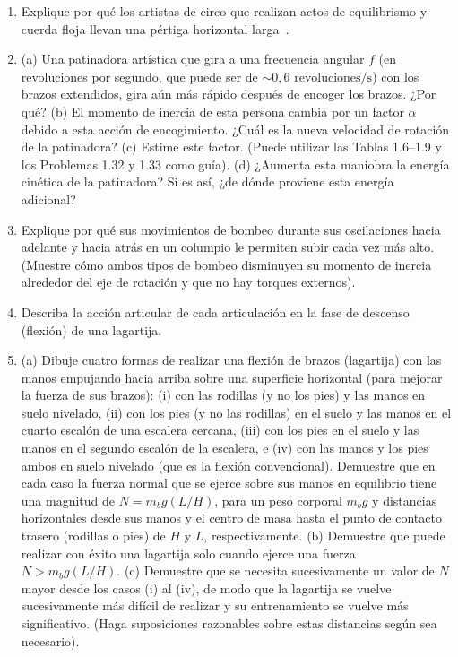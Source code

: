 \documentclass[12pt]{book}
\begin{document}
\begin{enumerate}
\item[3.59] Explique por qué los artistas de circo que realizan actos de equilibrismo y cuerda floja llevan una pértiga horizontal larga~\cite{ref16}.

\item[3.60] (a) Una patinadora artística que gira a una frecuencia angular $f$ (en revoluciones por segundo, que puede ser de $\sim 0{,}6\text{ revoluciones/s}$) con los brazos extendidos, gira aún más rápido después de encoger los brazos. ¿Por qué?
(b) El momento de inercia de esta persona cambia por un factor $\alpha$ debido a esta acción de encogimiento. ¿Cuál es la nueva velocidad de rotación de la patinadora?
(c) Estime este factor. (Puede utilizar las Tablas 1.6--1.9 y los Problemas 1.32 y 1.33 como guía).
(d) ¿Aumenta esta maniobra la energía cinética de la patinadora? Si es así, ¿de dónde proviene esta energía adicional?

\item[3.61] Explique por qué sus movimientos de bombeo durante sus oscilaciones hacia adelante y hacia atrás en un columpio le permiten subir cada vez más alto. (Muestre cómo ambos tipos de bombeo disminuyen su momento de inercia alrededor del eje de rotación y que no hay torques externos).

\item[3.62] Describa la acción articular de cada articulación en la fase de descenso (flexión) de una lagartija.

\item[3.63] (a) Dibuje cuatro formas de realizar una flexión de brazos (lagartija) con las manos empujando hacia arriba sobre una superficie horizontal (para mejorar la fuerza de sus brazos): (i) con las rodillas (y no los pies) y las manos en suelo nivelado, (ii) con los pies (y no las rodillas) en el suelo y las manos en el cuarto escalón de una escalera cercana, (iii) con los pies en el suelo y las manos en el segundo escalón de la escalera, e (iv) con las manos y los pies ambos en suelo nivelado (que es la flexión convencional). Demuestre que en cada caso la fuerza normal que se ejerce sobre sus manos en equilibrio tiene una magnitud de $N = m_b g (L/H)$, para un peso corporal $m_b g$ y distancias horizontales desde sus manos y el centro de masa hasta el punto de contacto trasero (rodillas o pies) de $H$ y $L$, respectivamente.
(b) Demuestre que puede realizar con éxito una lagartija solo cuando ejerce una fuerza $N > m_b g (L/H)$.
(c) Demuestre que se necesita sucesivamente un valor de $N$ mayor desde los casos (i) al (iv), de modo que la lagartija se vuelve sucesivamente más difícil de realizar y su entrenamiento se vuelve más significativo. (Haga suposiciones razonables sobre estas distancias según sea necesario).


\end{enumerate}
\end{document}
